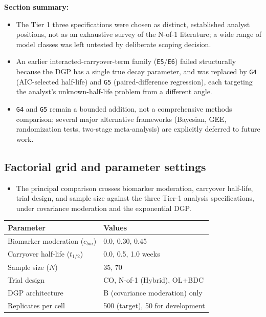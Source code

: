 \documentclass[
  11pt,
]{article}
\newcounter{none} %
\providecommand{\tightlist}{%
  \setlength{\itemsep}{0pt}\setlength{\parskip}{0pt}}
\begin{document}
\textbf{Section summary:}

\begin{itemize}
\tightlist
\item
  The Tier 1 three specifications were chosen as distinct, established
  analyst positions, not as an exhaustive survey of the N-of-1
  literature; a wide range of model classes was left untested by
  deliberate scoping decision.
\item
  An earlier interacted-carryover-term family (\texttt{E5}/\texttt{E6}) failed
  structurally because the DGP has a single true decay parameter, and
  was replaced by \texttt{G4} (AIC-selected half-life) and \texttt{G5}
  (paired-difference regression), each targeting the analyst's
  unknown-half-life problem from a different angle.
\item
  \texttt{G4} and \texttt{G5} remain a bounded addition, not a comprehensive methods
  comparison; several major alternative frameworks (Bayesian, GEE,
  randomization tests, two-stage meta-analysis) are explicitly
  deferred to future work.
\end{itemize}

\subsection{Factorial grid and parameter settings}\label{factorial-grid-and-parameter-settings}

\begin{itemize}
\tightlist
\item
  The principal comparison crosses biomarker moderation, carryover
  half-life, trial design, and sample size against the three Tier-1
  analysis specifications, under covariance moderation and the
  exponential DGP.
\end{itemize}

{\def\LTcaptype{none} %
\begin{longtable}[]{@{}ll@{}}
\toprule\noalign{}
Parameter & Values \\
\midrule\noalign{}
\endhead
\bottomrule\noalign{}
\endlastfoot
Biomarker moderation (\(c_{bm}\)) & 0.0, 0.30, 0.45 \\
Carryover half-life (\(t_{1/2}\)) & 0.0, 0.5, 1.0 weeks \\
Sample size (\(N\)) & 35, 70 \\
Trial design & CO, N-of-1 (Hybrid), OL+BDC \\
DGP architecture & B (covariance moderation) only \\
Replicates per cell & 500 (target), 50 for development \\
\end{longtable}
}
\end{document}
